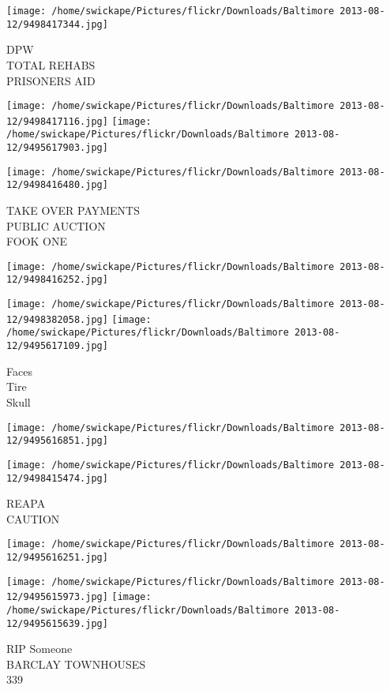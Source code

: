 \documentclass[10pt,letterpaper]{article}
\begin{document}
\vspace{0.25in}
\texttt{[image: /home/swickape/Pictures/flickr/Downloads/Baltimore 2013-08-12/9498417344.jpg]}

DPW\\
TOTAL REHABS\\
PRISONERS AID
\pagebreak

\texttt{[image: /home/swickape/Pictures/flickr/Downloads/Baltimore 2013-08-12/9498417116.jpg]}
\texttt{[image: /home/swickape/Pictures/flickr/Downloads/Baltimore 2013-08-12/9495617903.jpg]}

\texttt{[image: /home/swickape/Pictures/flickr/Downloads/Baltimore 2013-08-12/9498416480.jpg]}

TAKE OVER PAYMENTS\\
PUBLIC AUCTION\\
FOOK ONE
\pagebreak

\texttt{[image: /home/swickape/Pictures/flickr/Downloads/Baltimore 2013-08-12/9498416252.jpg]}

\vspace{0.25in}
\texttt{[image: /home/swickape/Pictures/flickr/Downloads/Baltimore 2013-08-12/9498382058.jpg]}
\texttt{[image: /home/swickape/Pictures/flickr/Downloads/Baltimore 2013-08-12/9495617109.jpg]}

Faces\\
Tire\\
Skull
\pagebreak

\texttt{[image: /home/swickape/Pictures/flickr/Downloads/Baltimore 2013-08-12/9495616851.jpg]}

\vspace{0.25in}
\texttt{[image: /home/swickape/Pictures/flickr/Downloads/Baltimore 2013-08-12/9498415474.jpg]}

REAPA\\
CAUTION
\pagebreak

\texttt{[image: /home/swickape/Pictures/flickr/Downloads/Baltimore 2013-08-12/9495616251.jpg]}

\vspace{0.25in}
\texttt{[image: /home/swickape/Pictures/flickr/Downloads/Baltimore 2013-08-12/9495615973.jpg]}
\texttt{[image: /home/swickape/Pictures/flickr/Downloads/Baltimore 2013-08-12/9495615639.jpg]}

RIP Someone\\
BARCLAY TOWNHOUSES\\
339
\pagebreak
\end{document}
